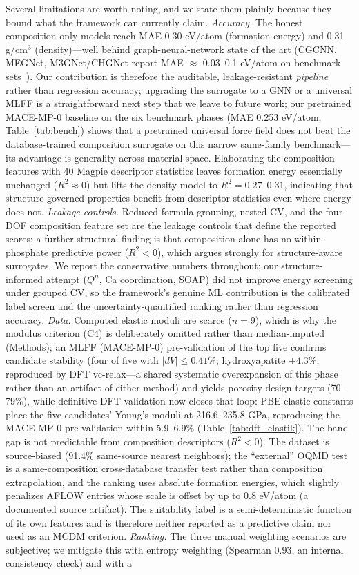 \documentclass[11pt,a4paper]{article}
\begin{document}
Several limitations are worth noting, and we state them plainly because they bound what the framework can currently claim. \emph{Accuracy.} The honest composition-only models reach MAE 0.30 eV/atom (formation energy) and 0.31 g/cm$^3$ (density)---well behind graph-neural-network state of the art (CGCNN, MEGNet, M3GNet/CHGNet report MAE $\approx$ 0.03--0.1 eV/atom on benchmark sets~\cite{xie2018,chen2019,chen2022,deng2023}). Our contribution is therefore the auditable, leakage-resistant \emph{pipeline} rather than regression accuracy; upgrading the surrogate to a GNN or a universal MLFF is a straightforward next step that we leave to future work; our pretrained MACE-MP-0 baseline on the six benchmark phases (MAE 0.253 eV/atom, Table~\ref{tab:bench}) shows that a pretrained universal force field does not beat the database-trained composition surrogate on this narrow same-family benchmark---its advantage is generality across material space. Elaborating the composition features with 40 Magpie descriptor statistics leaves formation energy essentially unchanged ($R^2 \approx 0$) but lifts the density model to $R^2 = 0.27$--$0.31$, indicating that structure-governed properties benefit from descriptor statistics even where energy does not. \emph{Leakage controls.} Reduced-formula grouping, nested CV, and the four-DOF composition feature set are the leakage controls that define the reported scores; a further structural finding is that composition alone has no within-phosphate predictive power ($R^2<0$), which argues strongly for structure-aware surrogates. We report the conservative numbers throughout; our structure-informed attempt ($Q^n$, Ca coordination, SOAP) did not improve energy screening under grouped CV, so the framework's genuine ML contribution is the calibrated label screen and the uncertainty-quantified ranking rather than regression accuracy. \emph{Data.} Computed elastic moduli are scarce ($n=9$), which is why the modulus criterion (C4) is deliberately omitted rather than median-imputed (Methods); an MLFF (MACE-MP-0) pre-validation of the top five confirms candidate stability (four of five with $|dV| \leq 0.41\%$; hydroxyapatite $+4.3\%$, reproduced by DFT vc-relax---a shared systematic overexpansion of this phase rather than an artifact of either method) and yields porosity design targets (70--79\%), while definitive DFT validation now closes that loop: PBE elastic constants place the five candidates' Young's moduli at 216.6--235.8 GPa, reproducing the MACE-MP-0 pre-validation within 5.9--6.9\% (Table~\ref{tab:dft_elastik}). The band gap is not predictable from composition descriptors ($R^2<0$). The dataset is source-biased (91.4\% same-source nearest neighbors); the ``external'' OQMD test is a same-composition cross-database transfer test rather than composition extrapolation, and the ranking uses absolute formation energies, which slightly penalizes AFLOW entries whose scale is offset by up to 0.8 eV/atom (a documented source artifact). The suitability label is a semi-deterministic function of its own features and is therefore neither reported as a predictive claim nor used as an MCDM criterion. \emph{Ranking.} The three manual weighting scenarios are subjective; we mitigate this with entropy weighting (Spearman 0.93, an internal consistency check) and with a 
\end{document}
